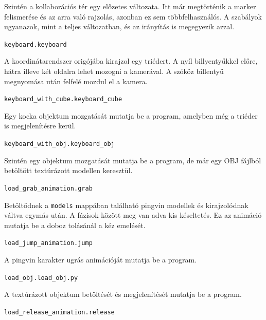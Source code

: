 \medskip
	
Szintén a kollaborációs tér egy előzetes változata.
Itt már megtörténik a marker felismerése és az arra való rajzolás, azonban ez sem többfelhasználós.
A szabályok ugyanazok, mint a teljes változatban, és az irányítás is megegyezik azzal.

\bigskip

\noindent \texttt{keyboard.keyboard}

\medskip
	
A koordinátarendszer origójába kirajzol egy triédert.
A nyíl billyentyűkkel előre, hátra illeve két oldalra lehet mozogni a kamerával.
A szóköz billentyű megnyomása után felfelé mozdul el a kamera.

\bigskip

\noindent \texttt{keyboard\_with\_cube.keyboard\_cube}

\medskip

Egy kocka objektum mozgatását mutatja be a program, amelyben még a triéder is megjelenítésre kerül.
	
\bigskip

\noindent \texttt{keyboard\_with\_obj.keyboard\_obj}

\medskip
	
Szintén egy objektum mozgatását mutatja be a program, de már egy OBJ fájlból betöltött textúrázott modellen keresztül.

\bigskip

\noindent \texttt{load\_grab\_animation.grab}

\medskip
	
Betöltődnek a \texttt{models} mappában található pingvin modellek és kirajzolódnak váltva egymás után. A fázisok között meg van adva kis késeltetés.
Ez az animáció mutatja be a doboz tolásánál a kéz emelését.

\bigskip

\noindent \texttt{load\_jump\_animation.jump}

\medskip

A pingvin karakter ugrás animációját mutatja be a program.

\bigskip

\noindent \texttt{load\_obj.load\_obj.py}

\medskip

A textúrázott objektum betöltését és megjelenítését mutatja be a program.

\bigskip

\noindent \texttt{load\_release\_animation.release}

